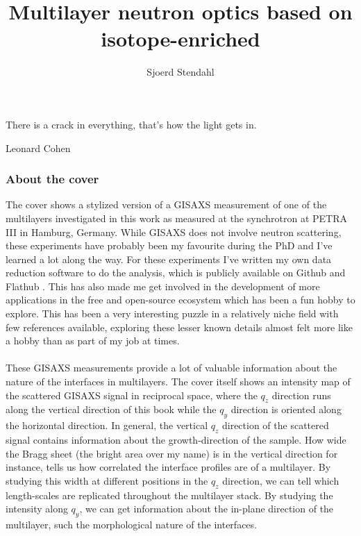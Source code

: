 \documentclass[colophon, english]{phduio}
\author{Sjoerd Stendahl}
\title{Multilayer neutron optics based on isotope-enriched \BC}
\subtitle{}
\affiliation
{
}
\begin{document}
    
	\thispagestyle{empty}
	\chapter*{}
	\thispagestyle{empty}
	\epigraph{There is a crack in everything, that's how the light gets in.}{Leonard Cohen}
	\clearpage
	\thispagestyle{empty}
	\subsection*{About the cover}
	The cover shows a stylized version of a GISAXS measurement of one of the multilayers investigated in this work as measured at the synchrotron at PETRA III in Hamburg, Germany. While GISAXS does not involve neutron scattering, these experiments have probably been my favourite during the PhD and I've learned a lot along the way. For these experiments I've written my own data reduction software to do the analysis, which is publicly available on Github and Flathub \cite{giscan}. This has also made me get involved in the development of more applications in the free and open-source ecosystem which has been a fun hobby to explore. This has been a very interesting puzzle in a relatively niche field with few references available, exploring these lesser known details almost felt more like a hobby than as part of my job at times. 
	\\
	\\
	These GISAXS measurements provide a lot of valuable information about the nature of the interfaces in multilayers. The cover itself shows an intensity map of the scattered GISAXS signal in reciprocal space, where the $q_z$ direction runs along the vertical direction of this book while the $q_y$ direction is oriented along the horizontal direction. In general, the vertical $q_z$ direction of the scattered signal contains information about the growth-direction of the sample. How wide the Bragg sheet (the bright area over my name) is in the vertical direction for instance, tells us how correlated the interface profiles are of a multilayer. By studying this width at different positions in the $q_z$ direction, we can tell which length-scales are replicated throughout the multilayer stack. By studying the intensity along $q_y$, we can get information about the in-plane direction of the multilayer, such the morphological nature of the interfaces.\\
	\\
\end{document}
